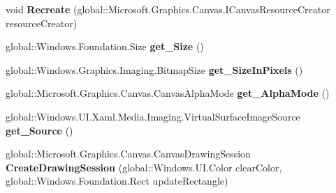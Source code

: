 \begin{DoxyCompactItemize}
void {\bfseries Recreate} (global\+::\+Microsoft.\+Graphics.\+Canvas.\+I\+Canvas\+Resource\+Creator resource\+Creator)
\item 
\mbox{\label{interface_microsoft_1_1_graphics_1_1_canvas_1_1_u_i_1_1_xaml_1_1_i_canvas_virtual_image_source_a8df57b04f7854479d8d5b4d90588a89a}} 
global\+::\+Windows.\+Foundation.\+Size {\bfseries get\+\_\+\+Size} ()
\item 
\mbox{\label{interface_microsoft_1_1_graphics_1_1_canvas_1_1_u_i_1_1_xaml_1_1_i_canvas_virtual_image_source_a94da0f764a564d73c97f33b5fba21363}} 
global\+::\+Windows.\+Graphics.\+Imaging.\+Bitmap\+Size {\bfseries get\+\_\+\+Size\+In\+Pixels} ()
\item 
\mbox{\label{interface_microsoft_1_1_graphics_1_1_canvas_1_1_u_i_1_1_xaml_1_1_i_canvas_virtual_image_source_ad058825143b5833f46d4cf80295da832}} 
global\+::\+Microsoft.\+Graphics.\+Canvas.\+Canvas\+Alpha\+Mode {\bfseries get\+\_\+\+Alpha\+Mode} ()
\item 
\mbox{\label{interface_microsoft_1_1_graphics_1_1_canvas_1_1_u_i_1_1_xaml_1_1_i_canvas_virtual_image_source_acbb06ee7976aaed52d3b36b37daabb4b}} 
global\+::\+Windows.\+U\+I.\+Xaml.\+Media.\+Imaging.\+Virtual\+Surface\+Image\+Source {\bfseries get\+\_\+\+Source} ()
\item 
\mbox{\label{interface_microsoft_1_1_graphics_1_1_canvas_1_1_u_i_1_1_xaml_1_1_i_canvas_virtual_image_source_a0dca36de10b0621fa57400291c8ac8e0}} 
global\+::\+Microsoft.\+Graphics.\+Canvas.\+Canvas\+Drawing\+Session {\bfseries Create\+Drawing\+Session} (global\+::\+Windows.\+U\+I.\+Color clear\+Color, global\+::\+Windows.\+Foundation.\+Rect update\+Rectangle)
\item 
\mbox{\label{interface_microsoft_1_1_graphics_1_1_canvas_1_1_u_i_1_1_xaml_1_1_i_canvas_virtual_image_source_a04c5d24777624a8eeb7d282703e2f97a}} 

\end{DoxyCompactItemize}
